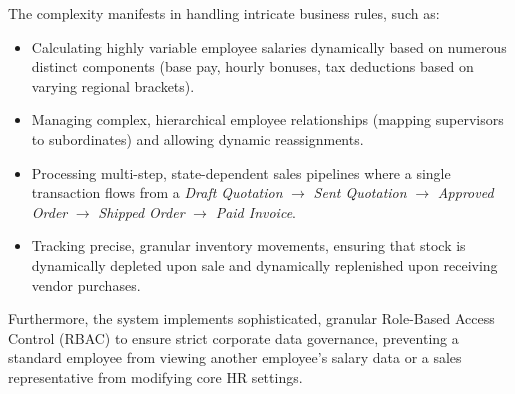 ﻿\documentclass[12pt,a4paper]{report}
\begin{document}
The complexity manifests in handling intricate business rules, such as:
\begin{itemize}
    \item Calculating highly variable employee salaries dynamically based on numerous distinct components (base pay, hourly bonuses, tax deductions based on varying regional brackets).
    \item Managing complex, hierarchical employee relationships (mapping supervisors to subordinates) and allowing dynamic reassignments.
    \item Processing multi-step, state-dependent sales pipelines where a single transaction flows from a \textit{Draft Quotation} $\rightarrow$ \textit{Sent Quotation} $\rightarrow$ \textit{Approved Order} $\rightarrow$ \textit{Shipped Order} $\rightarrow$ \textit{Paid Invoice}.
    \item Tracking precise, granular inventory movements, ensuring that stock is dynamically depleted upon sale and dynamically replenished upon receiving vendor purchases.
\end{itemize}
Furthermore, the system implements sophisticated, granular Role-Based Access Control (RBAC) to ensure strict corporate data governance, preventing a standard employee from viewing another employee's salary data or a sales representative from modifying core HR settings.
\end{document}
